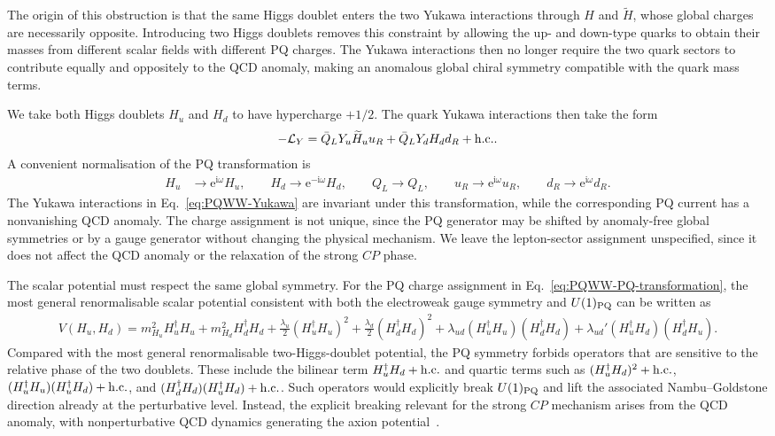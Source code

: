 \documentclass[review]{elsarticle}
\numberwithin{equation}{section}
\numberwithin{table}{section}
\numberwithin{figure}{section}
\def\i{\mathrm{i}}
\def\e{\mathrm{e}}
\def\hc{{\rm h.c.}}
\begin{document}
The origin of this obstruction is that the same Higgs doublet enters the two Yukawa interactions through $H$ and $\widetilde H$, whose global charges are necessarily opposite. Introducing two Higgs doublets removes this constraint by allowing the up- and down-type quarks to obtain their masses from different scalar fields with different PQ charges. The Yukawa interactions then no longer require the two quark sectors to contribute equally and oppositely to the QCD anomaly, making an anomalous global chiral symmetry compatible with the quark mass terms. 

We take both Higgs doublets $H_u$ and $H_d$ to have hypercharge $+1/2$. The quark Yukawa interactions then take the form
\begin{align}
    -\mathcal{L}_Y = \bar Q_LY_u\widetilde H_u u_R
    + \bar Q_LY_dH_d d_R +\hc .
    \label{eq:PQWW-Yukawa}
\end{align}
A convenient normalisation of the PQ transformation is
\begin{align}
    H_u&\rightarrow\e^{\i\omega}H_u,\qquad
    H_d\rightarrow\e^{-\i\omega}H_d,\qquad
    Q_L\rightarrow Q_L,\qquad
    u_R\rightarrow\e^{\i\omega}u_R,\qquad
    d_R\rightarrow\e^{\i\omega}d_R.
    \label{eq:PQWW-PQ-transformation}
\end{align}
The Yukawa interactions in Eq.~\eqref{eq:PQWW-Yukawa} are invariant under this transformation, while the corresponding PQ current has a nonvanishing QCD anomaly. The charge assignment is not unique, since the PQ generator may be shifted by anomaly-free global symmetries or by a gauge generator without changing the physical mechanism. We leave the lepton-sector assignment unspecified, since it does not affect the QCD anomaly or the relaxation of the strong $CP$ phase.

The scalar potential must respect the same global symmetry. For the PQ charge assignment in Eq.~\eqref{eq:PQWW-PQ-transformation}, the most general renormalisable scalar potential consistent with both the electroweak gauge symmetry and $U(1)_{\rm PQ}$ can be written as
\begin{align}
    V(H_u,H_d) = m_{H_u}^2H_u^\dagger H_u + m_{H_d}^2H_d^\dagger H_d + \frac{\lambda_u}{2} (H_u^\dagger H_u)^2
    + \frac{\lambda_d}{2} (H_d^\dagger H_d)^2
    + \lambda_{ud} (H_u^\dagger H_u)(H_d^\dagger H_d)
    + \lambda_{ud}' (H_u^\dagger H_d)(H_d^\dagger H_u).
    \label{eq:PQWW-scalar-potential}
\end{align}
Compared with the most general renormalisable two-Higgs-doublet potential, the PQ symmetry forbids operators that are sensitive to the relative phase of the two doublets. These include the bilinear term $H_u^\dagger H_d+\hc$ and quartic terms such as $(H_u^\dagger H_d)^2+\hc$, $(H_u^\dagger H_u)(H_u^\dagger H_d)+\hc$, and $(H_d^\dagger H_d)(H_u^\dagger H_d)+\hc$. Such operators would explicitly break $U(1)_{\rm PQ}$ and lift the associated Nambu--Goldstone direction already at the perturbative level. Instead, the explicit breaking relevant for the strong $CP$ mechanism arises from the QCD anomaly, with nonperturbative QCD dynamics generating the axion potential~\cite{Peccei:1977hh,Peccei:1977ur}.
\end{document}
